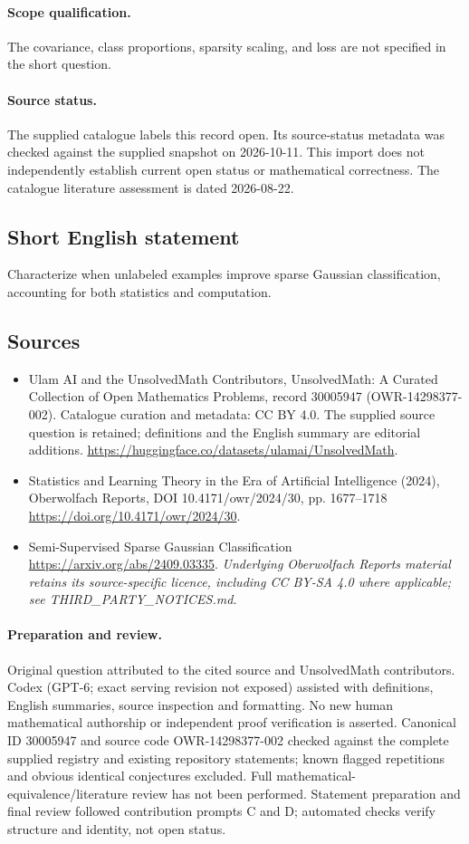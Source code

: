 \documentclass[11pt]{article}
\begin{document}
\paragraph{Scope qualification.}
The covariance, class proportions, sparsity scaling, and loss are not specified in the short question.
\paragraph{Source status.}
The supplied catalogue labels this record open. Its source-status metadata was checked against the supplied snapshot on 2026-10-11. This import does not independently establish current open status or mathematical correctness. The catalogue literature assessment is dated 2026-08-22.
\subsection{Short English statement}
Characterize when unlabeled examples improve sparse Gaussian classification, accounting for both statistics and computation.
\subsection{Sources}
\begin{itemize}
\item[S1] Ulam AI and the UnsolvedMath Contributors, UnsolvedMath: A Curated Collection of Open Mathematics Problems, record 30005947 (OWR-14298377-002). Catalogue curation and metadata: CC BY 4.0. The supplied source question is retained; definitions and the English summary are editorial additions.
\url{https://huggingface.co/datasets/ulamai/UnsolvedMath}.
\item[S2] Statistics and Learning Theory in the Era of Artificial Intelligence (2024), Oberwolfach Reports, DOI 10.4171/owr/2024/30, pp. 1677--1718
\url{https://doi.org/10.4171/owr/2024/30}.
\item[S3] Semi-Supervised Sparse Gaussian Classification
\url{https://arxiv.org/abs/2409.03335}.
\textit{Underlying Oberwolfach Reports material retains its source-specific licence, including CC BY-SA 4.0 where applicable; see THIRD\_PARTY\_NOTICES.md.}
\end{itemize}
\paragraph{Preparation and review.}
Original question attributed to the cited source and UnsolvedMath contributors. Codex (GPT-6; exact serving revision not exposed) assisted with definitions, English summaries, source inspection and formatting. No new human mathematical authorship or independent proof verification is asserted. Canonical ID 30005947 and source code OWR-14298377-002 checked against the complete supplied registry and existing repository statements; known flagged repetitions and obvious identical conjectures excluded. Full mathematical-equivalence/literature review has not been performed. Statement preparation and final review followed contribution prompts C and D; automated checks verify structure and identity, not open status.
\label{end:30005947}
\end{document}
